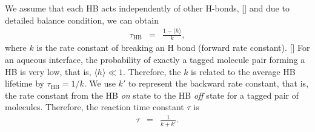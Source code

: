 We assume that each HB acts independently of other H-bonds, [\cite{AL96,AL00}] 
and due to detailed balance condition, we can obtain 
\begin{eqnarray}
  \tau_{\text{HB}} &=& \frac{1- \langle h\rangle}{k},
\label{eq:rate}
\end{eqnarray}
where $k$ is the rate constant of breaking an H bond (forward rate constant). [\cite{Chandler1986,Chandler1978}] 
For an aqueous interface, the probability of exactly a tagged molecule pair forming a HB is very low, that is, $\langle h\rangle \ll 1$. Therefore,
the $k$ is related to the average HB lifetime by $\tau_{\text{HB}}=1/k$.
We use $k'$ to represent the backward rate constant, that is, the rate constant from the HB \emph{on} state to the HB \emph{off} state for a tagged pair of molecules.
Therefore, the reaction time constant $\tau$ is 
\begin{eqnarray}
  \tau &=& \frac{1}{k+k'}.
\label{eq:reaction_rate_tau}
\end{eqnarray}
%

